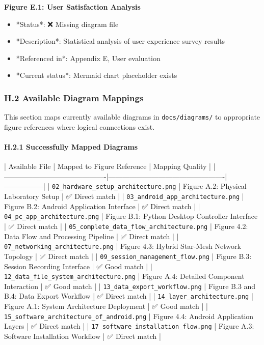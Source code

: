 \documentclass[12pt,a4paper]{article}
\begin{document}
{{\begin{itemize}
\end{itemize}
\textbf{Figure E.1: User Satisfaction Analysis}

\begin{itemize}
\item *Status*: ❌ Missing diagram file
\item *Description*: Statistical analysis of user experience survey results
\item *Referenced in*: Appendix E, User evaluation
\item *Current status*: Mermaid chart placeholder exists

\end{itemize}
\subsubsection{H.2 Available Diagram Mappings}

This section maps currently available diagrams in \texttt{docs/diagrams/} to appropriate figure references where logical
connections exist.

\paragraph{H.2.1 Successfully Mapped Diagrams}

| Available File                            | Mapped to Figure Reference                      | Mapping Quality |
|-------------------------------------------|-------------------------------------------------|-----------------|
| \texttt{02\_hardware\_setup\_architecture.png}      | Figure A.2: Physical Laboratory Setup           | ✅ Direct match  |
| \texttt{03\_android\_app\_architecture.png}         | Figure B.2: Android Application Interface       | ✅ Direct match  |
| \texttt{04\_pc\_app\_architecture.png}              | Figure B.1: Python Desktop Controller Interface | ✅ Direct match  |
| \texttt{05\_complete\_data\_flow\_architecture.png}  | Figure 4.2: Data Flow and Processing Pipeline   | ✅ Direct match  |
| \texttt{07\_networking\_architecture.png}          | Figure 4.3: Hybrid Star-Mesh Network Topology   | ✅ Direct match  |
| \texttt{09\_session\_management\_flow.png}          | Figure B.3: Session Recording Interface         | ✅ Good match    |
| \texttt{12\_data\_file\_system\_architecture.png}    | Figure A.4: Detailed Component Interaction      | ✅ Good match    |
| \texttt{13\_data\_export\_workflow.png}             | Figure B.3 and B.4: Data Export Workflow        | ✅ Direct match  |
| \texttt{14\_layer\_architecture.png}               | Figure A.1: System Architecture Deployment      | ✅ Good match    |
| \texttt{15\_software\_architecture\_of\_android.png} | Figure 4.4: Android Application Layers          | ✅ Direct match  |
| \texttt{17\_software\_installation\_flow.png}       | Figure A.3: Software Installation Workflow      | ✅ Direct match  |

}}
\end{document}
